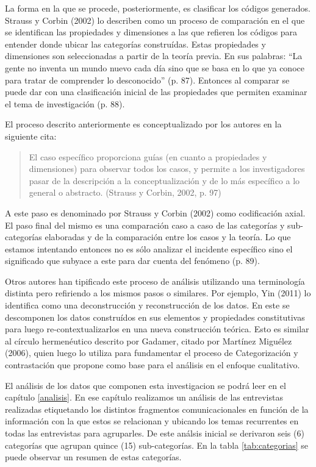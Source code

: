La forma en la que se procede, posteriormente, es clasificar los códigos
generados. Strauss y Corbin (2002) lo describen como un proceso de
comparación en el que se identifican las propiedades y dimensiones a las que
refieren los códigos para entender donde ubicar las categorías construídas.
Estas propiedades y dimensiones son seleccionadas a partir de la teoría previa.
En sus palabras: “La gente no inventa un mundo nuevo cada día sino que se
basa en lo que ya conoce para tratar de comprender lo desconocido” (p. 87).
Entonces al comparar se puede dar con una clasificación inicial de las
propiedades que permiten examinar el tema de investigación (p. 88).

El proceso descrito anteriormente es conceptualizado por los autores en la
siguiente cita:

\begin{quote}
    El caso específico proporciona guías (en cuanto a propiedades y
    dimensiones) para observar todos los casos, y permite a los
    investigadores pasar de la descripción a la conceptualización y de lo más
    específico a lo general o abstracto. (Strauss y Corbin, 2002, p. 97)
\end{quote}

A este paso es denominado por Strauss y Corbin (2002) como codificación axial.
El paso final del mismo es una comparación caso a caso de las categorías y
sub-categorías elaboradas y de la comparación entre los casos y la teoría.
Lo que estamos intentando entonces no es sólo analizar el incidente
específico sino el significado que subyace a este para dar cuenta del
fenómeno (p. 89).

Otros autores han tipificado este proceso de análisis utilizando una
terminología distinta pero refiriendo a los mismos pasos o similares.
Por ejemplo, Yin (2011) lo identifica como una deconstrucción y
reconstrucción de los datos.
En este se descomponen los datos construídos en sus elementos y propiedades
constitutivas para luego re-contextualizarlos en una nueva construcción teórica.
Esto es similar al círculo hermenéutico descrito por Gadamer, citado por
Martínez Miguélez (2006), quien luego lo utiliza para fundamentar el proceso
de Categorización y contrastación que propone como base para el análisis en
el enfoque cualitativo.

El análisis de los datos que componen esta investigacion se podrá leer en el
capítulo \ref{analisis}.
En ese capítulo realizamos un análisis de las entrevistas realizadas
etiquetando los distintos fragmentos comunicacionales en función de la
información con la que estos se relacionan y ubicando los temas recurrentes
en todas las entrevistas para agruparles.
De este análsis inicial se derivaron seis (6) categorías que agrupan quince
(15) sub-categorías.
En la tabla \ref{tab:categorias} se puede observar un resumen de estas
categorías.

